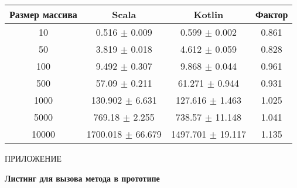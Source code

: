 \begin{table}[H]
\begin{center}
\begin{tabular}{|c|c|c|c|} \hline
Размер массива & Scala &  Kotlin & Фактор \\ \hline
10 & 0.516 $\pm$ 0.009 & 0.599 $\pm$ 0.002 & 0.861 \\ \hline
50 & 3.819 $\pm$ 0.018 & 4.612 $\pm$ 0.059 & 0.828 \\ \hline
100 & 9.492 $\pm$ 0.307 & 9.868 $\pm$ 0.044 & 0.961 \\ \hline
500 & 57.09 $\pm$ 0.211 & 61.271 $\pm$ 0.944 & 0.931 \\ \hline
1000 & 130.902 $\pm$ 6.631 & 127.616 $\pm$ 1.463 & 1.025 \\ \hline
5000 & 769.18 $\pm$ 2.255 & 738.57 $\pm$ 11.148 & 1.041 \\ \hline
10000 & 1700.018 $\pm$ 66.679 & 1497.701 $\pm$ 19.117 & 1.135 \\ \hline
\end{tabular}
\end{center}
\end{table}

\newpage

    \hfill ПРИЛОЖЕНИЕ 
    \begin{center}
        \bf{Листинг  для вызова метода в прототипе}
    \end{center}
    \markboth{\MakeUppercase{}}{}

